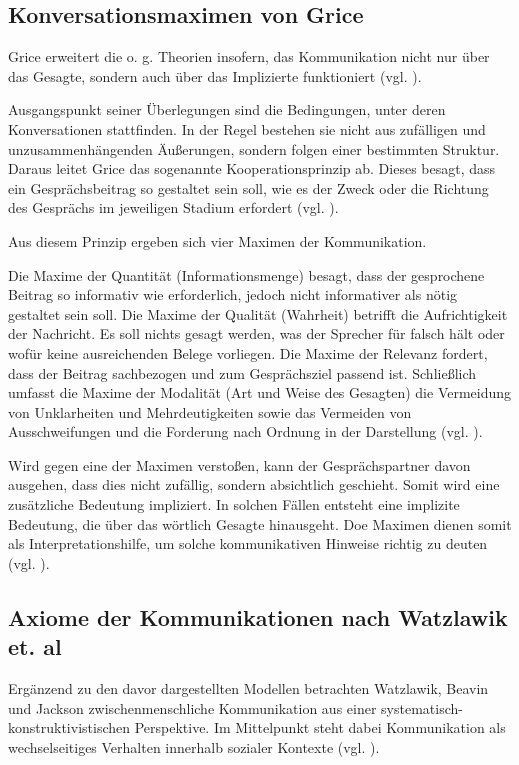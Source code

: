 \subsection{Konversationsmaximen von Grice}
Grice erweitert die o. g. Theorien insofern, das Kommunikation nicht nur über das Gesagte, sondern auch über das Implizierte funktioniert (vgl. \citealp[S. 43f]{grice_logic_1975}). 

Ausgangspunkt seiner Überlegungen sind die Bedingungen, unter deren Konversationen stattfinden. In der Regel bestehen sie nicht aus zufälligen und unzusammenhängenden Äußerungen, sondern folgen einer bestimmten Struktur. Daraus leitet Grice das sogenannte Kooperationsprinzip ab. Dieses besagt, dass ein Gesprächsbeitrag so gestaltet sein soll, wie es der Zweck oder die Richtung des Gesprächs im jeweiligen Stadium erfordert (vgl. \citealp[S. 45]{grice_logic_1975}).

Aus diesem Prinzip ergeben sich vier Maximen der Kommunikation. 

Die Maxime der Quantität (Informationsmenge) besagt, dass der gesprochene Beitrag so informativ wie erforderlich, jedoch nicht informativer als nötig gestaltet sein soll. Die Maxime der Qualität (Wahrheit) betrifft die Aufrichtigkeit der Nachricht. Es soll nichts gesagt werden, was der Sprecher für falsch hält oder wofür keine ausreichenden Belege vorliegen. Die Maxime der Relevanz fordert, dass der Beitrag sachbezogen und zum Gesprächsziel passend ist. Schließlich umfasst die Maxime der Modalität (Art und Weise des Gesagten) die Vermeidung von Unklarheiten und Mehrdeutigkeiten sowie das Vermeiden von Ausschweifungen und die Forderung nach Ordnung in der Darstellung (vgl. \citealp[S. 45f]{grice_logic_1975}).

Wird gegen eine der Maximen verstoßen, kann der Gesprächspartner davon ausgehen, dass dies nicht zufällig, sondern absichtlich geschieht. Somit wird eine zusätzliche Bedeutung impliziert. In solchen Fällen entsteht eine implizite Bedeutung, die über das wörtlich Gesagte hinausgeht. Doe Maximen dienen somit als Interpretationshilfe, um solche kommunikativen Hinweise richtig zu deuten (vgl. \citealp[S. 49f]{grice_logic_1975}).

\subsection{Axiome der Kommunikationen nach Watzlawik et. al}
Ergänzend zu den davor dargestellten Modellen betrachten Watzlawik, Beavin und Jackson zwischenmenschliche Kommunikation aus einer systematisch-konstruktivistischen Perspektive. Im Mittelpunkt steht dabei Kommunikation als wechselseitiges Verhalten innerhalb sozialer Kontexte (vgl. \citealp{Watzlawick2016-km}). 

